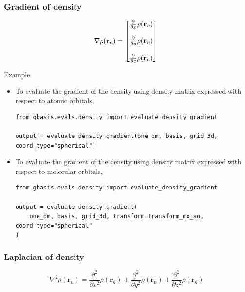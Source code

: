 \documentclass[letterpaper]{article}
\begin{document}
\subsubsection{Gradient of density}
\begin{equation}
  \nabla \rho(\mathbf{r}_n)
  =
  \begin{bmatrix}
    \frac{\partial}{\partial x} \rho(\mathbf{r}_n)\\\\
    \frac{\partial}{\partial y} \rho(\mathbf{r}_n)\\\\
    \frac{\partial}{\partial z} \rho(\mathbf{r}_n)
  \end{bmatrix}\\
\end{equation}

Example:
\begin{itemize}
\item To evaluate the gradient of the density using density matrix expressed
  with respect to atomic orbitals,
  \begin{lstlisting}[xleftmargin=-25pt]
from gbasis.evals.density import evaluate_density_gradient

output = evaluate_density_gradient(one_dm, basis, grid_3d, coord_type="spherical")
\end{lstlisting}
\item To evaluate the gradient of the density using density matrix expressed
  with respect to molecular orbitals,
  \begin{lstlisting}[xleftmargin=-25pt]
from gbasis.evals.density import evaluate_density_gradient

output = evaluate_density_gradient(
    one_dm, basis, grid_3d, transform=transform_mo_ao, coord_type="spherical"
)
\end{lstlisting}
\end{itemize}
\subsubsection{Laplacian of density}
\begin{equation}
  \nabla^2 \rho(\mathbf{r}_n)
  =
  \frac{\partial^2}{\partial x^2} \rho(\mathbf{r}_n)
  + \frac{\partial^2}{\partial y^2} \rho(\mathbf{r}_n)
  + \frac{\partial^2}{\partial z^2} \rho(\mathbf{r}_n)
\end{equation}
\end{document}
